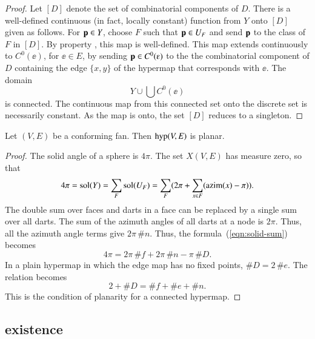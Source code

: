 \begin{proof} Let $[D]$ denote the set of combinatorial components of
$D$.  There is a well-defined continuous (in fact, locally constant)
function from $Y$ onto $[D]$ given as follows.  For ${\mathbf p}\in Y$,
choose $F$ such that ${\mathbf p}\in U_F$ and send ${\mathbf p}$ to the class of $F$
in $[D]$.  By property , this map is
well-defined. This map extends continuously to $C^0(\ee)$, for
$\ee\in E$, by sending $\p\in C^0(\ee)$ to the the combinatorial
component of $D$ containing the edge $\{x,y\}$ of the hypermap that
corresponds with $\ee$.  The domain
\begin{displaymath}
Y\cup \bigcup C^0(\ee)
\end{displaymath}
is connected.  The continuous map from this connected set onto the
discrete set is necessarily constant.  As the map is onto, the set
$[D]$ reduces to a singleton.
\end{proof}

\begin{lemma}  
Let $(V,E)$ be a conforming fan.  
Then ${\operatorname{hyp}}(V,E)$ is planar.
\end{lemma}
%
%

\begin{proof}  The solid angle of a sphere is $4\pi$.  The set $X(V,E)$
has measure zero, so that
\begin{equation}\label{eqn:solid-sum}
4\pi = \operatorname{sol}(Y)= \sum_F \operatorname{sol}(U_F) = 
\sum_F ( 2\pi + \sum_{x\in F} ({\operatorname{azim}}(x)-\pi) ).
\end{equation}
The double sum over faces and darts in a face can be replaced by
a single sum over all darts.  
The sum of the azimuth angles of all darts at a node is $2\pi$. Thus,
all the azimuth angle terms give $2\pi\,\#n$.
Thus, the formula~(\ref{eqn:solid-sum}) becomes
\begin{displaymath}
4\pi = 2\pi\, \#f +2\pi\,\#n - \pi\, \#D.
\end{displaymath}
In a plain hypermap in which the edge map has no fixed points, $\#D =
2\,\#e$.  The relation becomes
\begin{displaymath}
2 + \#D = \#f + \#e + \#n.
\end{displaymath}
This is the condition of planarity for a connected hypermap.
\end{proof}
%

\subsection{existence}




